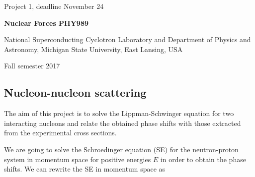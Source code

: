 \documentclass[%
oneside,                 %
final,                   %
10pt]{article}
\begin{document}

\newcommand{\exercisesection}[1]{\subsection*{#1}}






\thispagestyle{empty}

\begin{center}
{\LARGE\bf
\begin{spacing}{1.25}
Project 1, deadline  November 24
\end{spacing}
}
\end{center}


\begin{center}
{\bf Nuclear Forces PHY989}
\end{center}

    \begin{center}
\centerline{{\small National Superconducting Cyclotron Laboratory and Department of Physics and Astronomy, Michigan State University, East Lansing, USA}}
\end{center}
    

\begin{center}
Fall semester 2017
\end{center}

\vspace{1cm}


\subsection*{Nucleon-nucleon scattering}

The aim of this project is to solve the Lippman-Schwinger equation for two interacting nucleons and relate the obtained phase shifts with those extracted from the experimental cross sections.

We are going to solve the Schroedinger equation (SE) 
for the neutron-proton system 
in momentum space for positive energies $E$ in order to obtain
the phase shifts. 
We can rewrite the SE 
in momentum space as
\end{document}
